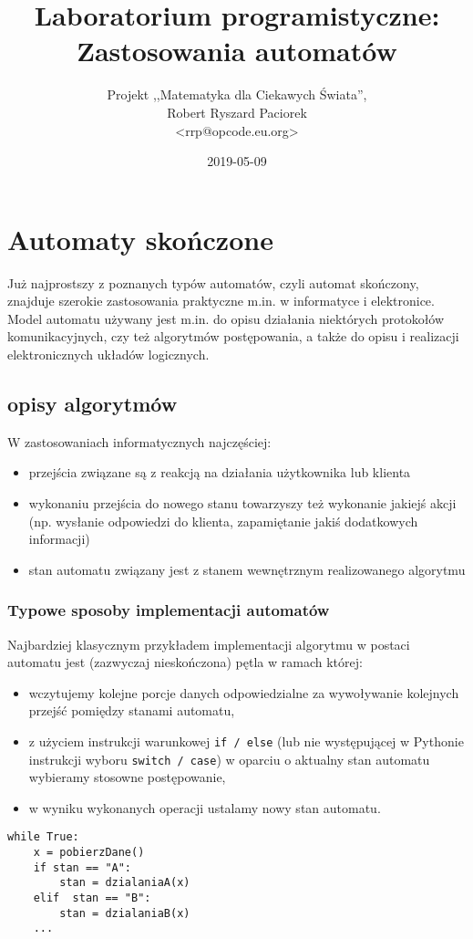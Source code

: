 \documentclass{pdfBooklets}
\title{Laboratorium programistyczne: Zastosowania automatów}
\author{%
	Projekt ,,Matematyka dla Ciekawych Świata'',\\
	Robert Ryszard Paciorek\\\normalsize\ttfamily <rrp@opcode.eu.org>
}
\date  {2019-05-09}
\begin{document}
\maketitle

\section{Automaty skończone}

Już najprostszy z poznanych typów automatów, czyli automat skończony, znajduje szerokie zastosowania praktyczne m.in. w informatyce i elektronice. Model automatu używany jest m.in. do opisu działania niektórych protokołów komunikacyjnych, czy też algorytmów postępowania, a także do opisu i realizacji elektronicznych układów logicznych.

\subsection{opisy algorytmów}
W zastosowaniach informatycznych najczęściej:
\begin{itemize}
\item przejścia związane są z reakcją na działania użytkownika lub klienta
\item wykonaniu przejścia do nowego stanu towarzyszy też wykonanie jakiejś akcji (np. wysłanie odpowiedzi do klienta, zapamiętanie jakiś dodatkowych informacji)
\item stan automatu związany jest z stanem wewnętrznym realizowanego algorytmu
\end{itemize}

\subsubsection{Typowe sposoby implementacji automatów}


Najbardziej klasycznym przykładem implementacji algorytmu w postaci automatu jest (zazwyczaj nieskończona) pętla w ramach której:

\noindent\begin{minipage}[t]{0.61\textwidth}
\begin{itemize}
\item wczytujemy kolejne porcje danych odpowiedzialne za wywoływanie kolejnych przejść pomiędzy stanami automatu,
\item z użyciem instrukcji warunkowej {\tt if / else} (lub nie występującej w Pythonie instrukcji wyboru {\tt switch / case}) w oparciu o aktualny stan automatu wybieramy stosowne postępowanie,
\item w wyniku wykonanych operacji ustalamy nowy stan automatu.
\end{itemize}
\end{minipage}\hfill\begin{minipage}[t]{0.35\textwidth}
\vspace{-8pt}
\begin{verbatim}
while True:
    x = pobierzDane()
    if stan == "A":
        stan = dzialaniaA(x)
    elif  stan == "B":
        stan = dzialaniaB(x)
    ...
\end{verbatim}
\end{minipage}
\end{document}
